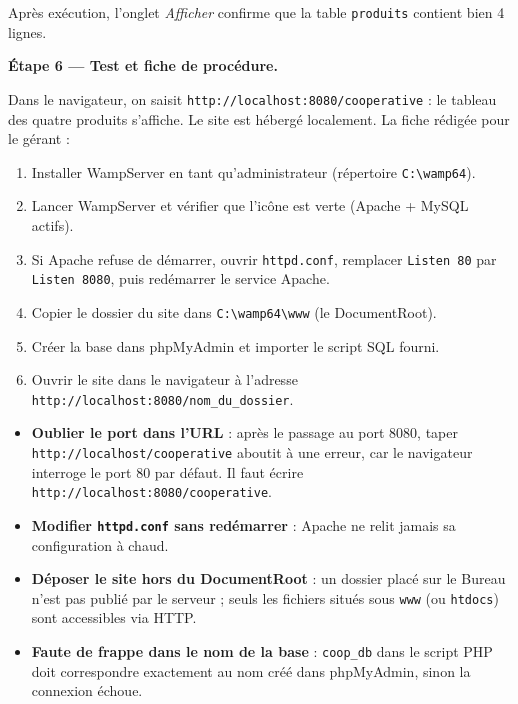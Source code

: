 \documentclass[11pt]{article}
\begin{document}
\begin{exoresolu}
Après exécution, l'onglet \emph{Afficher} confirme que la table \texttt{produits} contient bien 4 lignes.

\textbf{Étape 6 — Test et fiche de procédure.}

Dans le navigateur, on saisit \texttt{http://localhost:8080/cooperative} : le tableau des quatre produits s'affiche. Le site est hébergé localement. La fiche rédigée pour le gérant :

\begin{enumerate}
\item Installer WampServer en tant qu'administrateur (répertoire \texttt{C:\textbackslash wamp64}).
\item Lancer WampServer et vérifier que l'icône est verte (Apache + MySQL actifs).
\item Si Apache refuse de démarrer, ouvrir \texttt{httpd.conf}, remplacer \texttt{Listen 80} par \texttt{Listen 8080}, puis redémarrer le service Apache.
\item Copier le dossier du site dans \texttt{C:\textbackslash wamp64\textbackslash www} (le DocumentRoot).
\item Créer la base dans phpMyAdmin et importer le script SQL fourni.
\item Ouvrir le site dans le navigateur à l'adresse \texttt{http://localhost:8080/nom\_du\_dossier}.
\end{enumerate}
\end{exoresolu}

\begin{attention}
\begin{itemize}
\item \textbf{Oublier le port dans l'URL} : après le passage au port 8080, taper \texttt{http://localhost/cooperative} aboutit à une erreur, car le navigateur interroge le port 80 par défaut. Il faut écrire \texttt{http://localhost:8080/cooperative}.
\item \textbf{Modifier \texttt{httpd.conf} sans redémarrer} : Apache ne relit jamais sa configuration à chaud.
\item \textbf{Déposer le site hors du DocumentRoot} : un dossier placé sur le Bureau n'est pas publié par le serveur ; seuls les fichiers situés sous \texttt{www} (ou \texttt{htdocs}) sont accessibles via HTTP.
\item \textbf{Faute de frappe dans le nom de la base} : \texttt{coop\_db} dans le script PHP doit correspondre exactement au nom créé dans phpMyAdmin, sinon la connexion échoue.
\end{itemize}
\end{attention}
\end{document}
